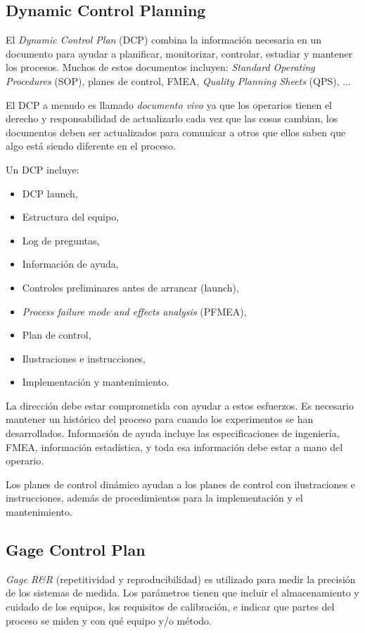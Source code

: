 \documentclass[]{article}
\begin{document}
\subsection{Dynamic Control Planning}
El \textit{Dynamic Control Plan} (DCP) combina la información necesaria en un documento para ayudar a planificar, monitorizar, controlar, estudiar y mantener los procesos. Muchos de estos documentos incluyen: \textit{Standard Operating Procedures} (SOP), planes de control, FMEA, \textit{Quality Planning Sheets} (QPS), ...

El DCP a menudo es llamado \textit{documento vivo} ya que los operarios tienen el derecho y responsabilidad de actualizarlo cada vez que las cosas cambian, los documentos deben ser actualizados para comunicar a otros que ellos saben que algo está siendo diferente en el proceso.

Un DCP incluye:
\begin{itemize}
	\item DCP launch,
	\item Estructura del equipo,
	\item Log de preguntas,
	\item Información de ayuda,
	\item Controles preliminares antes de arrancar (launch),
	\item \textit{Process failure mode and effects analysis} (PFMEA),
	\item Plan de control,
	\item Ilustraciones e instrucciones,
	\item Implementación y mantenimiento.
\end{itemize}

La dirección debe estar comprometida con ayudar a estos esfuerzos. Es necesario mantener un histórico del proceso para cuando los experimentos se han desarrollados. Información de ayuda incluye las especificaciones de ingeniería, FMEA, información estadística, y toda esa información debe estar a mano del operario.

Los planes de control dinámico ayudan a los planes de control con ilustraciones e instrucciones, además de procedimientos para la implementación y el mantenimiento.

\subsection{Gage Control Plan}

\textit{Gage R\&R} (repetitividad y reproducibilidad) es utilizado para medir la precisión de los sistemas de medida. Los parámetros tienen que incluir el almacenamiento y cuidado de los equipos, los requisitos de calibración, e indicar que partes del proceso se miden y con qué equipo y/o método.
\end{document}
